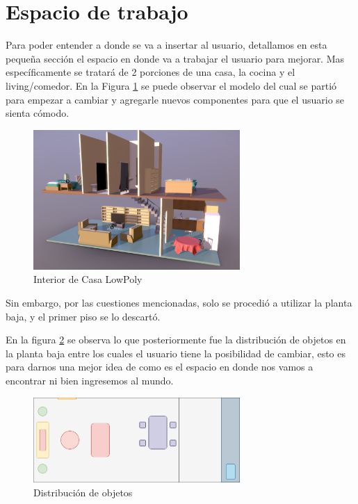 \section{Espacio de trabajo}

Para poder entender a donde se va a insertar al usuario, detallamos en esta pequeña sección el espacio en donde va a trabajar el usuario para mejorar. Mas específicamente se tratará de 2 porciones de una casa, la cocina y el living/comedor. En la Figura \ref{low_poly_house_interior} se puede observar el modelo del cual se partió para empezar a cambiar y agregarle nuevos componentes para que el usuario se sienta cómodo.

\begin{figure}[ht!]
    \centering
    \includegraphics[width=0.7\textwidth]{figs/lowpoly_house_interior.png}
    \caption{Interior de Casa LowPoly}
    \label{low_poly_house_interior}
\end{figure}

Sin embargo, por las cuestiones mencionadas, solo se procedió a utilizar la planta baja, y el primer piso se lo descartó.

En la figura \ref{house_distribution} se observa lo que posteriormente fue la distribución de objetos en la planta baja entre los cuales el usuario tiene la posibilidad de cambiar, esto es para darnos una mejor idea de como es el espacio en donde nos vamos a encontrar ni bien ingresemos al mundo.

\begin{figure}[ht!]
    \centering
    \includegraphics[width=0.7\textwidth]{figs/distribucion.png}
    \caption{Distribución de objetos}
    \label{house_distribution}
\end{figure}


